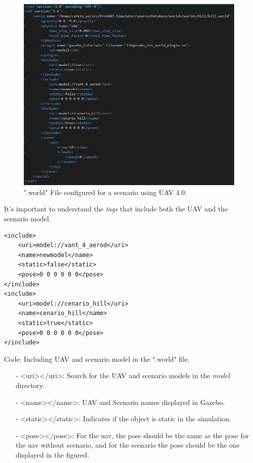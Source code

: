 			\begin{figure}[!ht]
	\centering
	\includegraphics[width=350pt]{figuras/ex4cenario.png}
	\caption{".world" File configured for a scenario using UAV 4.0.}
	\label{ex4cenario}
\end{figure}

It's important to understand the \textit{tags} that include both the UAV and the scenario model.
\begin{verbatim}
<include>
	<uri>model://vant_4_aerod</uri>
	<name>newmodel</name>
	<static>false</static>
	<pose>0 0 0 0 0 0</pose>
</include>
<include>
	<uri>model://cenario_hill</uri>
	<name>cenario_hill</name>
	<static>true</static>
	<pose>0 0 0 0 0 0</pose>
</include>
 \end{verbatim}
	\centerline{Code: Including UAV and scenario model in the ".world" file.}


\begin{itemize}
	\itemsep0em
	\item[-] <uri></uri>: Search for the UAV and scenario models in the \textit{model} directory.
	\item[-] <name></name>: UAV and Scenario names displayed in Gazebo.
	\item[-] <static></static>: Indicates if the object is static in the simulation.
	\item[-] <pose></pose>: For the uav, the pose should be the same as the pose for the uav without scenario, and for the scenario the pose should be the one displayed in the figured. 
\end{itemize}

